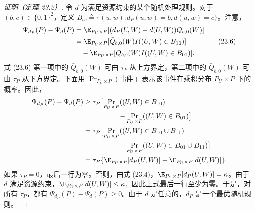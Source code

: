 \begin{proof}[证明（定理 23.2）]
令 $d$ 为满足资源约束的某个随机处理规则。对于 $(b,c)\in\{0,1\}^2$，定义
$B_{bc}\triangleq\{(u,w):d_P(u,w)=b,d(u,w)=c\}$。注意，
\begin{equation}
\begin{aligned}
 \Psi_{d_P}(P)-\Psi_d(P)
 &=\E_{P_U\times P}[(d_P(U,W)-d(U,W))\bar Q_{b,0}(W)]\\
 &=\E_{P_U\times P}[\bar Q_{b,0}(W)I((U,W)\in B_{10})]\\
 &\quad-\E_{P_U\times P}[\bar Q_{b,0}(W)I((U,W)\in B_{01})].
\end{aligned}
\tag{23.6}
\end{equation}
式 (23.6) 第一项中的 $\bar Q_{b,0}(W)$ 可由 $\tau_P$ 从上方界定，第二项中的 $\bar Q_{b,0}(W)$ 可由 $\tau_P$ 从下方界定。下面用 $\Pr_{P_U\times P}(\text{事件})$ 表示该事件在乘积分布 $P_U\times P$ 下的概率。因此，
\[
\begin{aligned}
 \Psi_{d_P}(P)-\Psi_d(P)
 &\geq\tau_P\bigl[\Pr_{P_U\times P}((U,W)\in B_{10})\\
 &\hspace{5em}-\Pr_{P_U\times P}((U,W)\in B_{01})\bigr]\\
 &=\tau_P\bigl[\Pr_{P_U\times P}((U,W)\in B_{10}\cup B_{11})\\
 &\hspace{5em}-\Pr_{P_U\times P}((U,W)\in B_{01}\cup B_{11})\bigr]\\
 &=\tau_P\{\E_{P_U\times P}[d_P(U,W)]-\E_{P_U\times P}[d(U,W)]\}.
\end{aligned}
\]
如果 $\tau_P=0$，最后一行为零。否则，由式 (23.4)，$\E_{P_U\times P}[d_P(U,W)]=\kappa$。由于 $d$ 满足资源约束，$\E_{P_U\times P}[d(U,W)]\leq\kappa$，因此上式最后一行至少为零。于是，对所有 $\tau_P$，都有 $\Psi_{d_P}(P)-\Psi_d(P)\geq0$。由于 $d$ 是任意的，$d_P$ 是一个最优随机规则。
\end{proof}
